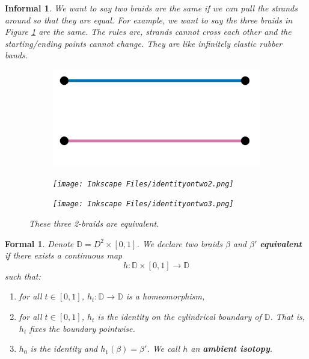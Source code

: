 \documentclass{amsart}
\newtheorem*{formal}{Formal}
\newtheorem*{informal}{Informal}
\begin{document}
\begin{definition}\label{equivalentbraids}
	\begin{informal}
	   We want to say two braids are the same if we can pull the strands around
		so that they are equal. For example, we want to say the three braids in
		Figure \ref{equiv-2-braids} are the same. The rules are, strands cannot
		cross each other
		and the starting/ending points cannot change. They are like infinitely
		elastic rubber bands.
		\begin{figure}
			\begin{subfigure}{.33\textwidth}
				\centering
				\includegraphics[width=.9\linewidth]{Inkscape Files/identityontwo.png}
			\end{subfigure}%
			\begin{subfigure}{.33\textwidth}
				\centering
				\texttt{[image: Inkscape
				Files/identityontwo2.png]}
			\end{subfigure}%
			\begin{subfigure}{.33\textwidth}
				\centering
				\texttt{[image: Inkscape
				Files/identityontwo3.png]}
			\end{subfigure}
			\caption{These three 2-braids are equivalent.}
			\label{equiv-2-braids}
		\end{figure}
	\end{informal}
	\begin{formal}
		Denote \(\mathbb{D} = D^2\times[0, 1]\). We declare two braids \(\beta\)
		and \(\beta'\) \textbf{equivalent}
		if there	exists a continuous map 
		\[
			h: \mathbb{D}\times[0, 1]\to\mathbb{D}
		\]
		such that: 
		\begin{enumerate}[label=(\roman*)]
			\item for all \(t\in[0, 1]\), \(h_t:\mathbb{D}\to\mathbb{D}\) is a
			homeomorphism,
			\item for all \(t\in[0, 1]\), \(h_t\) is the identity on the 
			cylindrical boundary of \(\mathbb{D}\). That is, \(h_t\) fixes
			the boundary pointwise.
			\item \(h_0\) is the identity and \(h_1(\beta) = \beta'\). We call \(h\)
			an \textbf{ambient isotopy}. 		
		\end{enumerate} 
	\end{formal}
\end{definition}
\end{document}
